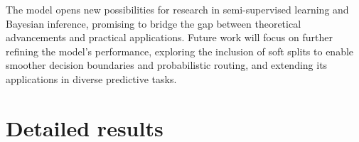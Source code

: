 \documentclass[3p,review,authoryear]{elsarticle}
\begin{document}
The model opens new possibilities for research in semi-supervised learning and Bayesian inference, promising to bridge the gap between theoretical advancements and practical applications.
Future work will focus on further refining the model's performance, exploring the inclusion of soft splits to enable smoother decision boundaries and probabilistic routing, and extending its applications in diverse predictive tasks.

\appendix
\section{Detailed results}
\label{app:res}
\end{document}

